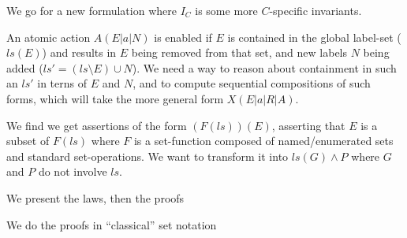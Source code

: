 \label{ha:mViews}


We go for a new formulation
where $I_C$ is some more $C$-specific invariants.


An atomic action $A(E|a|N)$ is enabled if $E$ is contained
in the global label-set ($ls(E)$)
and results in $E$ being removed from that set, and new labels
$N$ being added ($ls'=(ls\setminus E)\cup N$).
We need a way to reason about containment in such an $ls'$
in terns of $E$ and $N$, and to compute sequential compositions
of such forms, which will take the more general form $X(E|a|R|A)$.

We find we get assertions of the form $(F(ls))(E)$,
asserting that $E$ is a subset of $F(ls)$ where $F$ is a set-function
composed of named/enumerated sets and standard set-operations.
We want to transform it into $ls(G) \land P$ where $G$ and $P$
do not involve $ls$.

We present the laws,
then the proofs

We do the proofs in ``classical'' set notation


